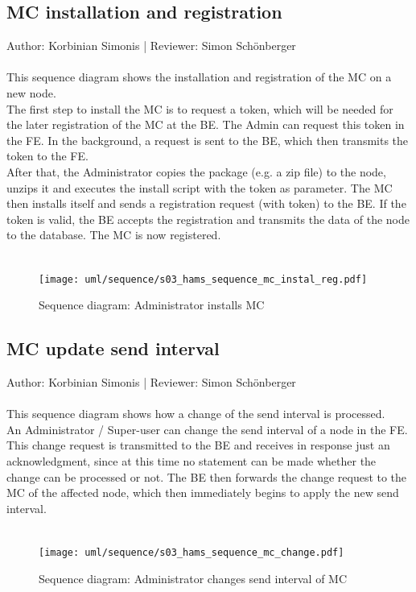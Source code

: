\documentclass{scrreprt}
\begin{document}
\subsection{MC installation and registration}
Author:  Korbinian Simonis |
Reviewer: Simon Sch\"onberger\\ \\
This sequence diagram shows the installation and registration of the MC on a new node.\\
The first step to install the MC is to request a token, which will be needed for the later registration of the MC at the BE. The Admin can request this token in the FE. In the background, a request is sent to the BE, which then transmits the token to the FE. \\
After that, the Administrator copies the package (e.g. a zip file) to the node, unzips it and executes the install script with the token as parameter. The MC then installs itself and sends a registration request (with token) to the BE. If the token is valid, the BE accepts the registration and transmits the data of the node to the database. The MC is now registered.
\\ \\
\begin{figure}[h]
	\centering
	\texttt{[image: uml/sequence/s03\_hams\_sequence\_mc\_instal\_reg.pdf]}
	\caption{Sequence diagram: Administrator installs MC}
	\label{mcInstallationSequence}
\end{figure}
\pagebreak
\subsection{MC update send interval}
Author:  Korbinian Simonis |
Reviewer: Simon Sch\"onberger\\ \\
This sequence diagram shows how a change of the send interval is processed. \\
An Administrator / Super-user can change the send interval of a node in the FE. This change request is transmitted to the BE and receives in response just an acknowledgment, since at this time no statement can be made whether the change can be processed or not.
The BE then forwards the change request to the MC of the affected node, which then immediately begins to apply the new send interval.
\\ \\
\begin{figure}[h]
	\centering
	\texttt{[image: uml/sequence/s03\_hams\_sequence\_mc\_change.pdf]}
	\caption{Sequence diagram: Administrator changes send interval of MC}
	\label{mcChangeIntervalSequence}
\end{figure}
\end{document}
